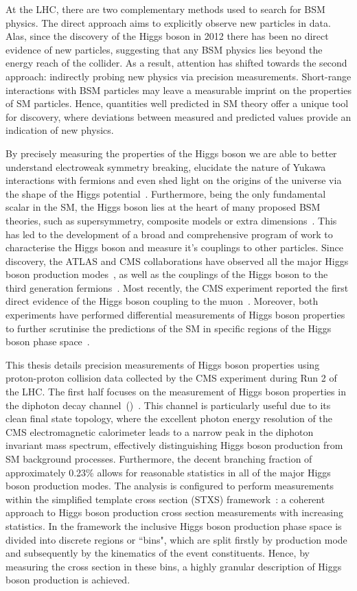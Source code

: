 At the LHC, there are two complementary methods used to search for BSM physics. The direct approach aims to explicitly observe new particles in data. Alas, since the discovery of the Higgs boson in 2012 there has been no direct evidence of new particles, suggesting that any BSM physics lies beyond the energy reach of the collider. As a result, attention has shifted towards the second approach: indirectly probing new physics via precision measurements. Short-range interactions with BSM particles may leave a measurable imprint on the properties of SM particles. Hence, quantities well predicted in SM theory offer a unique tool for discovery, where deviations between measured and predicted values provide an indication of new physics. 

By precisely measuring the properties of the Higgs boson we are able to better understand electroweak symmetry breaking, elucidate the nature of Yukawa interactions with fermions and even shed light on the origins of the universe via the shape of the Higgs potential~\cite{}. Furthermore, being the only fundamental scalar in the SM, the Higgs boson lies at the heart of many proposed BSM theories, such as supersymmetry, composite models or extra dimensions~\cite{}. This has led to the development of a broad and comprehensive program of work to characterise the Higgs boson and measure it's couplings to other particles. Since discovery, the ATLAS and CMS collaborations have observed all the major Higgs boson production modes~\cite{}, as well as the couplings of the Higgs boson to the third generation fermions~\cite{}. Most recently, the CMS experiment reported the first direct evidence of the Higgs boson coupling to the muon~\cite{}. Moreover, both experiments have performed differential measurements of Higgs boson properties to further scrutinise the predictions of the SM in specific regions of the Higgs boson phase space~\cite{}.

This thesis details precision measurements of Higgs boson properties using proton-proton collision data collected by the CMS experiment during Run 2 of the LHC. The first half focuses on the measurement of Higgs boson properties in the diphoton decay channel~(\Hgg)~\cite{}. This channel is particularly useful due to its clean final state topology, where the excellent photon energy resolution of the CMS electromagnetic calorimeter leads to a narrow peak in the diphoton invariant mass spectrum, effectively distinguishing Higgs boson production from SM background processes. Furthermore, the decent branching fraction of approximately 0.23\% allows for reasonable statistics in all of the major Higgs boson production modes. The analysis is configured to perform measurements within the simplified template cross section (STXS) framework~\cite{}: a coherent approach to Higgs boson production cross section measurements with increasing statistics. In the framework the inclusive Higgs boson production phase space is divided into discrete regions or ``bins", which are split firstly by production mode and subsequently by the kinematics of the event constituents. Hence, by measuring the cross section in these bins, a highly granular description of Higgs boson production is achieved.

